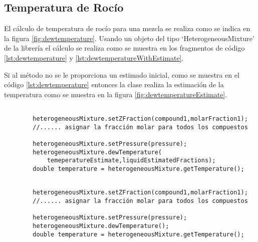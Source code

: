 \subsection{Temperatura de Rocío}\label{subsec:dewtemperature}

	El cálculo de temperatura de rocío para una mezcla se realiza como se indica en la figura \ref{fig:dewtemperature}. Usando un objeto del tipo `HeterogeneousMixture' de la librería \Materia el cálculo se realiza como se muestra en los fragmentos de código \ref{lst:dewtemperature} y \ref{lst:dewtemperatureWithEstimate}.

	Si al método no se le proporciona un estimado inicial, como se muestra en el código \ref{lst:dewtemperature} entonces la clase realiza la estimación de la temperatura como se muestra en la figura \ref{fig:dewtemperatureEstimate}. 

	\begin{lstlisting}[label={lst:dewtemperatureWithEstimate},caption={Cálculo de la temperatura de rocío proporcionando un estimado inicial.}]

		heterogeneousMixture.setZFraction(compound1,molarFraction1);
		//...... asignar la fracción molar para todos los compuestos

		heterogeneousMixture.setPressure(pressure);
		heterogeneousMixture.dewTemperature(
			temeperatureEstimate,liquidEstimatedFractions);
		double temperature = heterogeneousMixture.getTemperature();
	\end{lstlisting}


	\begin{lstlisting}[label={lst:dewtemperature},caption={Cálculo de la temperatura de rocío.}]

		heterogeneousMixture.setZFraction(compound1,molarFraction1);
		//...... asignar la fracción molar para todos los compuestos

		heterogeneousMixture.setPressure(pressure);
		heterogeneousMixture.dewTemperature();
		double temperature = heterogeneousMixture.getTemperature();
	\end{lstlisting}

